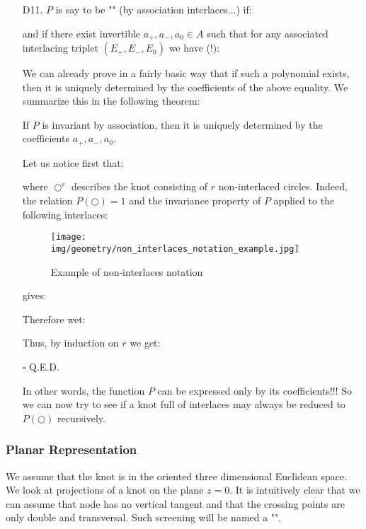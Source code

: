 {\begin{enumerate}
		\item[D11.] $P$ is say to be "" (by association interlaces...) if:
		
		and if there exist invertible $a_+,a_{-},a_0 \in A$ such that for any associated interlacing triplet $(E_+,E_{-},E_0)$ we have (!):
		
		We can already prove in a fairly basic way that if such a polynomial exists, then it is uniquely determined by the coefficients of the above equality. We summarize this in the following theorem:
		
		\begin{theorem}
			If $P$ is invariant by association, then it is uniquely determined by the coefficients  $a_+,a_{-},a_0$.
		\end{theorem}
		\begin{dem}
		Let us notice first that:
		
		where $\bigcirc^r$ describes the knot consisting of $r$ non-interlaced circles. Indeed, the relation $P(\bigcirc)=1$ and the invariance property of $P$ applied to the following interlaces:
		\begin{figure}[H]
			\centering
			\texttt{[image: img/geometry/non\_interlaces\_notation\_example.jpg]}
			\caption{Example of non-interlaces notation}
		\end{figure}
		gives:
		
		Therefore wet:
		
		Thus, by induction on $r$ we get:
		
		\begin{flushright}
			$\square$  Q.E.D.
		\end{flushright}
		\end{dem}
		In other words, the function $P$ can be expressed only by its coefficients!!! So we can now try to see if a knot full of interlaces may always be reduced to $P(\bigcirc)$ recursively.
	\end{enumerate}
	
	\subsubsection{Planar Representation}
	We assume that the knot is in the oriented three dimensional Euclidean space. We look at projections of a knot on the plane $z=0$. It is intuitively clear that we can assume that node has no vertical tangent and that the crossing points are only double and transversal. Such screening will be named a "".
	
}
